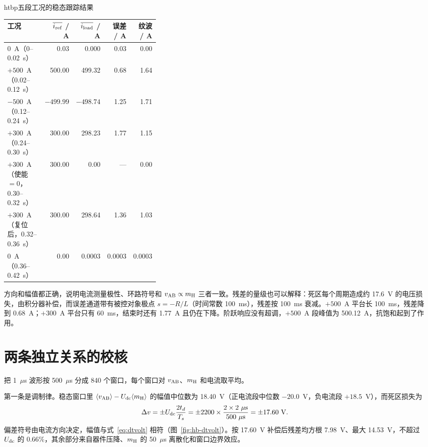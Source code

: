 \begin{dtable}{htbp}{五段工况的稳态跟踪结果}
\label{tab:hb-track}
\begin{tabularx}{\linewidth}{P{0.36\linewidth}RRRR}
\toprule
\headrow 工况 & $\overline{i_{\mathrm{ref}}}$ / A & $\overline{i_{\mathrm{load}}}$ / A & 误差 / A & 纹波 / A \\
~A（0--0.02~s） & 0.03 & 0.000 & 0.03 & 0.00 \\
$+500$~A（0.02--0.12~s） & 500.00 & 499.32 & 0.68 & 1.64 \\
$-500$~A（0.12--0.24~s） & $-499.99$ & $-498.74$ & 1.25 & 1.71 \\
$+300$~A（0.24--0.30~s） & 300.00 & 298.23 & 1.77 & 1.15 \\
$+300$~A（使能 $=0$，0.30--0.32~s） & 300.00 & 0.00 & --- & 0.00 \\
$+300$~A（复位后，0.32--0.36~s） & 300.00 & 298.64 & 1.36 & 1.03 \\
0~A（0.36--0.42~s） & 0.00 & 0.0003 & 0.0003 & 0.0003 \\
\bottomrule
\end{tabularx}
\end{dtable}

方向和幅值都正确，说明电流测量极性、环路符号和 $v_{\mathrm{AB}}\propto m_{\mathrm{H}}$ 三者一致。残差的量级也可以解释：死区每个周期造成约 17.6~V 的电压损失，由积分器补偿，而误差通道带有被控对象极点 $s=-R/L$（时间常数 100~ms），残差按 100~ms 衰减。$+500$~A 平台长 100~ms，残差降到 0.68~A；$+300$~A 平台只有 60~ms，结束时还有 1.77~A 且仍在下降。阶跃响应没有超调，$+500$~A 段峰值为 500.12~A，抗饱和起到了作用。

\section{两条独立关系的校核}

把 1~$\mu$s 波形按 500~$\mu$s 分成 840 个窗口，每个窗口对 $v_{\mathrm{AB}}$、$m_{\mathrm{H}}$ 和电流取平均。

第一条是调制律。稳态窗口里 $\langle v_{\mathrm{AB}}\rangle-U_{\mathrm{dc}}\langle m_{\mathrm{H}}\rangle$ 的幅值中位数为 18.40~V（正电流段中位数 $-20.0$~V，负电流段 $+18.5$~V），而死区损失为
\begin{equation}
\Delta v=\pm U\sub{dc}\frac{2t_d}{T_s}=\pm2200\times\frac{2\times2\ \mu\mathrm{s}}{500\ \mu\mathrm{s}}=\pm17.60\ \mathrm{V}.
\label{eq:dtvolt}
\end{equation}
偏差符号由电流方向决定，幅值与式~\eqref{eq:dtvolt} 相符（图~\ref{fig:hb-dtvolt}）。按 17.60~V 补偿后残差均方根 7.98~V、最大 14.53~V，不超过 $U_{\mathrm{dc}}$ 的 0.66\%，其余部分来自器件压降、$m_{\mathrm{H}}$ 的 50~$\mu$s 离散化和窗口边界效应。

